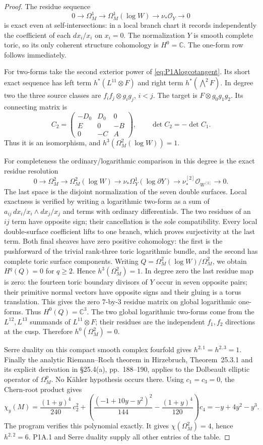 \begin{proof}
The residue sequence
\[
0\to\Omega_M^1\to\Omega_M^1(\log W)\to\nu_*\mathcal O_Y\to0
\]
is exact even at self-intersections: in a local branch chart it
records independently the coefficient of each $dx_i/x_i$ on
$x_i=0$. The normalization $Y$ is smooth complete toric, so its
only coherent structure cohomology is $H^0=\mathbb C$.
The one-form row follows immediately.

For two-forms take the second exterior power of
\eqref{eq:P1Alogcotangent}. Its short exact sequence has left
term $h^*(L^{11}\otimes F)$ and right term
$h^*(\bigwedge^2F)$. In degree two the three source classes
are $f_if_j\otimes g_ig_j$, $i<j$. The target is
$F\otimes g_0g_1g_2$. Its connecting matrix is
\[
C_2=\begin{pmatrix}-D_0&D_0&0\\E&0&-B\\0&-C&A\end{pmatrix},
\qquad \det C_2=-\det C_1.
\]
Thus it is an isomorphism, and
$h^3(\Omega_M^2(\log W))=1$.

For completeness the ordinary/logarithmic comparison in this
degree is the exact residue resolution
\[
0\to\Omega_M^2\to\Omega_M^2(\log W)
 \to\nu_*\Omega_Y^1(\log\partial Y)
 \to\nu^{[2]}_*\mathcal O_{W^{[2]}}\to0.
\]
The last space is the disjoint normalization of the seven
double surfaces. Local exactness is verified by writing a
logarithmic two-form as a sum of
$a_{ij}\,dx_i/x_i\wedge dx_j/x_j$ and terms with ordinary
differentials. The two residues of an $ij$ term have opposite
sign; their cancellation is the sole compatibility. Every local
double-surface coefficient lifts to one branch, which proves
surjectivity at the last term.
Both final sheaves have zero positive cohomology: the first
is the pushforward of the trivial rank-three toric logarithmic
bundle, and the second has complete toric surface components.
Writing $Q=\Omega_M^2(\log W)/\Omega_M^2$, we obtain
$H^q(Q)=0$ for $q\ge2$. Hence
$h^3(\Omega_M^2)=1$.
In degree zero the last residue map is zero: the fourteen toric
boundary divisors of $Y$ occur in seven opposite pairs; their
primitive normal vectors have opposite signs and their gluing
is a torus translation. This gives the zero $7$-by-$3$ residue
matrix on global logarithmic one-forms. Thus $H^0(Q)=\mathbb C^3$.
The two global logarithmic two-forms come from the
$L^{12},L^{13}$ summands of $L^{11}\otimes F$; their residues
are the independent $f_1,f_2$ directions at the cusp.
Therefore $h^0(\Omega_M^2)=0$.

Serre duality on this compact smooth complex fourfold gives
$h^{2,1}=h^{2,3}=1$. Finally the analytic Riemann--Roch theorem
in Hirzebruch, Theorem~25.3.1 and its explicit derivation
in \S25.4(a), pp.~188--190, applies to the Dolbeault elliptic
operator of $\Omega_M^p$. No Kähler hypothesis occurs there.
Using $c_1=c_3=0$, the Chern-root product gives
\[
\chi_y(M)=
\frac{(1+y)^4}{240}\,c_2^2+
\left(\frac{(-1+10y-y^2)^2}{144}
       -\frac{(1+y)^4}{120}\right)c_4
=-y+4y^2-y^3.
\]
The program verifies this polynomial exactly. It gives
$\chi(\Omega_M^2)=4$, hence $h^{2,2}=6$.
P1A.1 and Serre duality supply all other entries of the table.
\end{proof}

